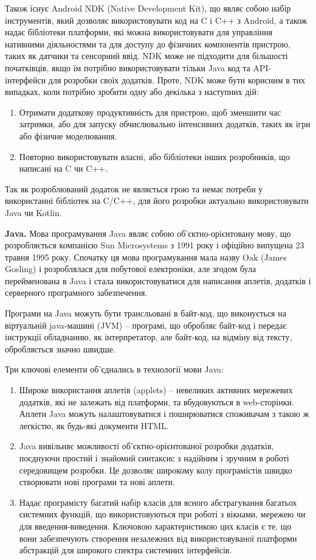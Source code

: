 \documentclass[../main.tex]{subfiles}
\begin{document}
Також існує Android NDK (Native Development Kit), що являє собою набір інструментів, який дозволяє використовувати код на C і C++ з Android, а також надає бібліотеки платформи, які можна використовувати для управління нативними діяльностями та для доступу до фізичних компонентів пристрою, таких як датчики та сенсорний ввід. NDK може не підходити для більшості початківців, якщо їм потрібно використовувати тільки Java код та API-інтерфейси для розробки своїх додатків. Проте, NDK може бути корисним в тих випадках, коли потрібно зробити одну або декілька з наступних дій:

\begin{enumerate}
	\item Отримати додаткову продуктивність для пристрою, щоб зменшити час затримки, або для запуску обчислювально інтенсивних додатків, таких як ігри або фізичне моделювання.
	\item Повторно використовувати власні, або бібліотеки інших розробників, що написані на C чи C++.
\end{enumerate}

Так як розроблюваний додаток не являється грою та немає потреби у використанні бібліотек на C/C++, для його розробки актуально використовувати Java чи Kotlin.

\textbf{Java.}
Мова програмування Java являє собою об'єктно-орієнтовану мову, що розробляється компанією Sun Microsystems з 1991 року і офіційно випущена 23 травня 1995 року. Спочатку ця мова програмування  мала назву Oak (James Gosling) і розроблялася для побутової електроніки, але згодом була перейменована в Java і стала використовуватися для написання аплетів, додатків і серверного програмного забезпечення.

Програми на Java можуть бути трансльовані в байт-код, що виконується на віртуальній java-машині (JVM) -- програмі, що обробляє байт-код і передає інструкції обладнанню, як інтерпретатор, але байт-код, на відміну від тексту, обробляється значно швидше.

Три ключові елементи об'єднались в технології мови Java:
\begin{enumerate}
	\item Широке використання аплетів (applets) -- невеликих активних мережевих додатків, які не залежать від платформи, та вбудовуються в web-сторінки. Аплети Java можуть налаштовуватися і поширюватися споживачам з такою ж легкістю, як будь-які документи HTML.
	\item Java вивільняє можливості об'єктно-орієнтованої розробки додатків, поєднуючи простий і знайомий синтаксис з надійним і зручним в роботі середовищем розробки. Це дозволяє широкому колу програмістів швидко створювати нові програми та нові аплети.
	\item Надає програмісту багатий набір класів для ясного абстрагування багатьох системних функцій, що використовуються при роботі з вікнами, мережею чи для введення-виведення. Ключовою характеристикою цих класів є те, що вони забезпечують створення незалежних від використовуваної платформи абстракцій для широкого спектра системних інтерфейсів.
\end{enumerate}
\end{document}
